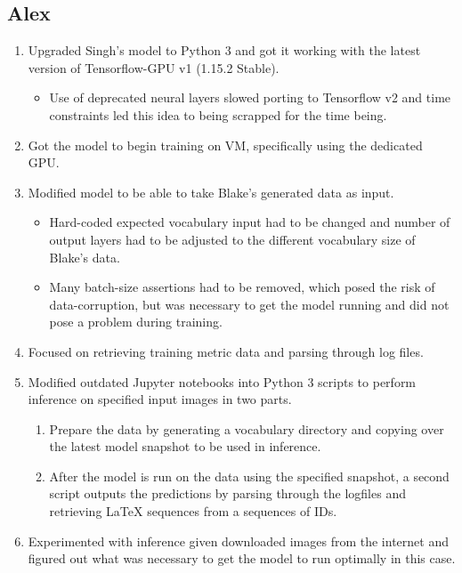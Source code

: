 \documentclass[12pt]{article}
\begin{document}
\begin{appendix}
    \subsection{Alex}
      \begin{enumerate}
        \item Upgraded Singh's model to Python 3 and got it working with the
        latest version of Tensorflow-GPU v1 (1.15.2 Stable).
        \begin{itemize}
          \item Use of deprecated neural layers slowed porting to Tensorflow v2
          and time constraints led this idea to being scrapped for the time
          being. 
        \end{itemize}
        \item Got the model to begin training on VM, specifically using the dedicated GPU. 
        \item Modified model to be able to take Blake's generated data as input.
        \begin{itemize}
          \item Hard-coded expected vocabulary input had to be changed and number
          of output layers had to be adjusted to the different vocabulary
          size of Blake's data.
          \item Many batch-size assertions had to be removed, which posed the
          risk of data-corruption, but was necessary to get the model running
          and did not pose a problem during training.
        \end{itemize}
        \item Focused on retrieving training metric data and parsing through log files.
        \item Modified outdated Jupyter notebooks into Python 3 scripts to
        perform inference on specified input images in two parts.
        \begin{enumerate}
          \item Prepare the data by generating a vocabulary directory and
          copying over the latest model snapshot to be used in inference.
          \item After the model is run on the data using the specified snapshot,
          a second script outputs the predictions by parsing through the
          logfiles and retrieving \LaTeX{} sequences from a sequences of IDs.
        \end{enumerate}
        \item Experimented with inference given downloaded images from the
        internet and figured out what was necessary to get the model to run
        optimally in this case.
      \end{enumerate}

\end{appendix}
\end{document}
